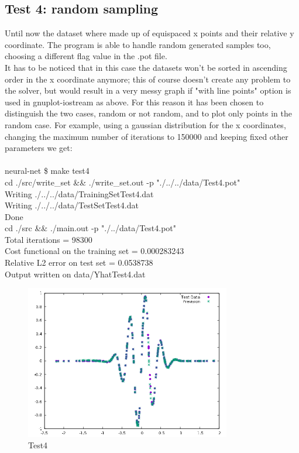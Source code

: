 \documentclass[12pt, a4paper]{report}
\theoremstyle{definition}
\begin{document}
\subsection{Test 4: random sampling}
Until now the dataset where made up of equispaced x points and their relative y coordinate. The program is able to handle random generated samples too, choosing a different flag value in the .pot file.\\
It has to be noticed that in this case the datasets won't be sorted in ascending order in the x coordinate anymore; this of course doesn't create any problem to the solver, but would result in a very messy graph if "with line points" option is used in gnuplot-iostream as above. For this reason it has been chosen to distinguish the two cases, random or not random, and to plot only points in the random case. For example, using a gaussian distribution for the x coordinates, changing the maximum number of iterations to 150000 and keeping fixed other parameters we get:\\
{\\\ttfamily neural-net \$ make test4\\
	cd ./src/write\_set \&\& ./write\_set.out -p "./../../data/Test4.pot"\\
	Writing ./../../data/TrainingSetTest4.dat\\
	Writing ./../../data/TestSetTest4.dat\\
	Done\\
	cd ./src \&\& ./main.out -p "./../data/Test4.pot"\\
	Total iterations = 98300\\
	Cost functional on the training set = 0.000283243\\
	Relative L2 error on test set = 0.0538738\\
	Output written on data/YhatTest4.dat\\
}
\begin{figure}[H]
	\centering
	\includegraphics[width=0.8\textwidth]{img/Test4} 
	\caption{Test4}
\end{figure}
\end{document}
